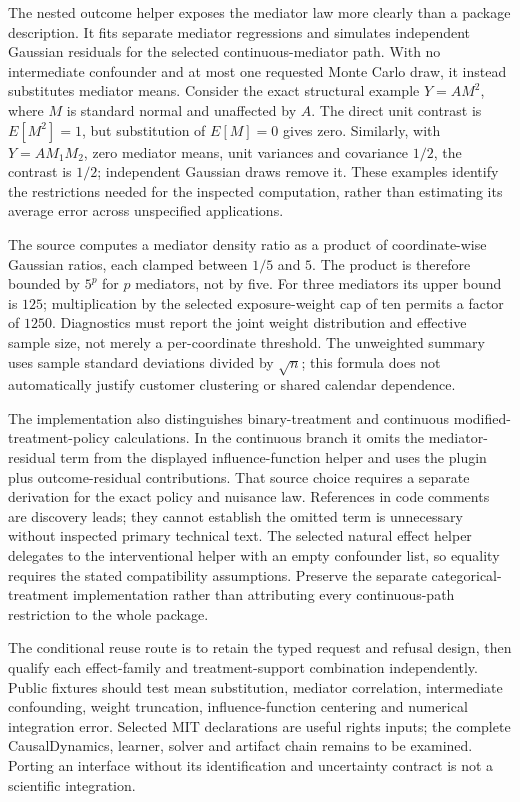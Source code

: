 The nested outcome helper exposes the mediator law more clearly than a package
description. It fits separate mediator regressions and simulates independent
Gaussian residuals for the selected continuous-mediator path. With no
intermediate confounder and at most one requested Monte Carlo draw, it instead
substitutes mediator means. Consider the exact structural example
$Y=A M^2$, where $M$ is standard normal and unaffected by $A$. The direct unit
contrast is $E[M^2]=1$, but substitution of $E[M]=0$ gives zero. Similarly, with
$Y=A M_1M_2$, zero mediator means, unit variances and covariance $1/2$, the
contrast is $1/2$; independent Gaussian draws remove it. These examples identify
the restrictions needed for the inspected computation, rather than estimating
its average error across unspecified applications.\citep{exec25_omed_causalmediation,exec25_omed_choice}

The source computes a mediator density ratio as a product of coordinate-wise
Gaussian ratios, each clamped between $1/5$ and $5$. The product is therefore
bounded by $5^p$ for $p$ mediators, not by five. For three mediators its upper
bound is $125$; multiplication by the selected exposure-weight cap of ten
permits a factor of $1250$. Diagnostics must report the joint weight
distribution and effective sample size, not merely a per-coordinate threshold.
The unweighted summary uses sample standard deviations divided by $\sqrt n$;
this formula does not automatically justify customer clustering or shared
calendar dependence.\citep{exec25_omed_causalmediation,exec25_omed_choice}

The implementation also distinguishes binary-treatment and continuous
modified-treatment-policy calculations. In the continuous branch it omits
the mediator-residual term from the displayed influence-function helper and
uses the plugin plus outcome-residual contributions. That source choice requires
a separate derivation for the exact policy and nuisance law. References in code
comments are discovery leads; they cannot establish the omitted term is
unnecessary without inspected primary technical text. The selected natural
effect helper delegates to the interventional helper with an empty confounder
list, so equality requires the stated compatibility assumptions. Preserve the
separate categorical-treatment implementation rather than attributing every
continuous-path restriction to the whole package.\citep{exec25_omed_causalmediation}

The conditional reuse route is to retain the typed request and refusal design,
then qualify each effect-family and treatment-support combination independently.
Public fixtures should test mean substitution, mediator correlation, intermediate
confounding, weight truncation, influence-function centering and numerical
integration error. Selected MIT declarations are useful rights inputs; the
complete CausalDynamics, learner, solver and artifact chain remains to be
examined. Porting an interface without its identification and uncertainty
contract is not a scientific integration.\citep{exec25_omed_causalmediation,exec25_omed_targeted,exec25_omed_choice}


